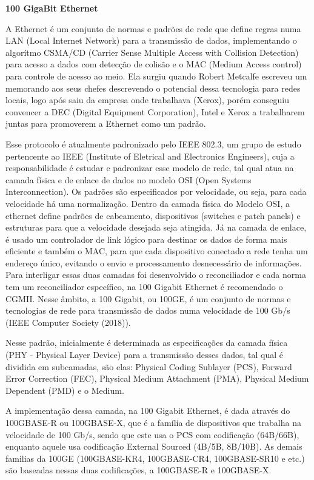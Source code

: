 \documentclass[a4paper,12pt]{article}
\begin{document}
\begin{center}
\textbf{{\LARGE 100 GigaBit Ethernet}} \\ \vspace{0.5cm}
\end{center}

A Ethernet é um conjunto de normas e padrões de rede que define regras numa LAN (Local Internet Network) para a transmissão de dados, implementando o algorítmo CSMA/CD (Carrier Sense Multiple Access with Collision Detection) para acesso a dados com detecção de colisão e o MAC (Medium Access control) para controle de acesso ao meio. Ela surgiu quando Robert Metcalfe escreveu um memorando aos seus chefes descrevendo o potencial dessa tecnologia para redes locais, logo após saiu da empresa onde trabalhava (Xerox), porém conseguiu convencer a DEC (Digital Equipment Corporation), Intel e Xerox a trabalharem juntas para promoverem a Ethernet como um padrão.

Esse protocolo é atualmente padronizado pelo IEEE 802.3, um grupo de estudo pertencente ao IEEE (Institute of Eletrical and Electronics Engineers), cuja a responsabilidade é estudar e padronizar esse modelo de rede, tal qual atua na camada física e de enlace de dados no modelo OSI (Open Systems Interconnection). Os padrões são especificados por velocidade, ou seja, para cada velocidade há uma normalização.
Dentro da camada física do Modelo OSI, a ethernet define padrões de cabeamento, dispositivos (switches e patch panels) e estruturas para que a velocidade desejada seja atingida.
Já na camada de enlace, é usado um controlador de link lógico para destinar os dados de forma mais eficiente e também o MAC, para que cada dispositivo conectado a rede tenha um endereço único, evitando o envio e processamento desnecessário de informações.
Para interligar essas duas camadas foi desenvolvido o reconciliador e cada norma tem um reconciliador específico, na 100 Gigabit Ethernet é recomendado o CGMII.
Nesse âmbito, a 100 Gigabit, ou 100GE, é um conjunto de normas e tecnologias de rede para transmissão de dados numa velocidade de 100 Gb/s (IEEE Computer Society (2018)).


Nesse padrão, inicialmente é determinada as especificações da camada física (PHY - Physical Layer Device) para a transmissão desses dados, tal qual é dividida em subcamadas, são elas: Physical Coding Sublayer (PCS), Forward Error Correction (FEC), Physical Medium Attachment (PMA), Physical Medium Dependent (PMD) e o Medium.

A implementação dessa camada, na 100 Gigabit Ethernet, é dada através do 100GBASE-R ou 100GBASE-X, que é a família de dispositivos que trabalha na velocidade de 100 Gb/s, sendo que este usa o PCS com codificação (64B/66B), enquanto aquele usa codificação External Sourced (4B/5B, 8B/10B). As demais familias da 100GE (100GBASE-KR4, 100GBASE-CR4, 100GBASE-SR10 e etc.) são baseadas nessas duas codificações, a 100GBASE-R e 100GBASE-X.
\end{document}
